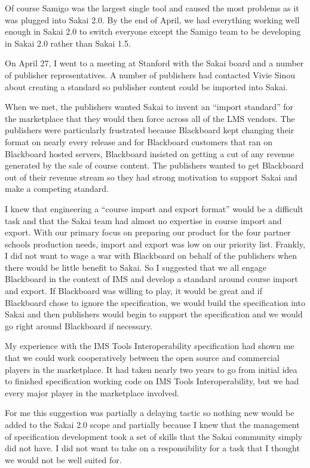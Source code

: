 \documentclass[12pt]{book}
\begin{document}
Of course Samigo was the largest single tool and
caused the most problems as it was plugged into
Sakai 2.0.  By the end of April, we had everything working
well enough in Sakai 2.0 to switch everyone
except the Samigo team to be developing in
Sakai 2.0 rather than Sakai 1.5.

On April 27, I went to a meeting at Stanford with the
Sakai board and a number of publisher representatives.
A number of publishers had contacted Vivie Sinou
about creating a standard so publisher content
could be imported into Sakai.

When we met, the
publishers wanted Sakai to invent an ``import standard''
for the marketplace that they would then force
across all of the LMS vendors.
The publishers were particularly frustrated because
Blackboard kept changing their format on nearly
every release and for Blackboard customers that
ran on Blackboard hosted servers, Blackboard insisted
on getting a cut of any revenue generated by the sale
of course content.  The publishers wanted to get Blackboard
out of their revenue stream so they had strong motivation
to support Sakai and make a competing standard.

I knew that engineering a ``course import and export
format'' would be a difficult task and that the Sakai
team had almost no expertise in course import
and export.  With our primary focus on preparing
our product for the four partner schools production
needs, import and export was low on our priority
list.
Frankly, I did not want to wage a war with
Blackboard on behalf of the publishers when there
would be little benefit to Sakai.  So I
suggested that we all engage Blackboard in the
context of IMS and develop a standard around
course import and export.  If Blackboard was
willing to play, it would be great and if Blackboard
chose to ignore the specification, we would build the
specification into Sakai and then publishers would
begin to support the specification and we would
go right around Blackboard if necessary.

My experience with the IMS Tools Interoperability
specification had shown me that we could work
cooperatively between the open source and commercial
players in the marketplace. It had taken nearly
two years to go from initial idea to finished
specification working code on IMS Tools Interoperability,
but we had every major player in the marketplace involved.

For me this suggestion was partially a delaying tactic
so nothing new would be added to the Sakai 2.0 scope
and partially because I knew that the management
of specification development took a set of skills
that the Sakai community simply did not have.   I did not
want to take on a responsibility for a task that I thought
we would not be well suited for.
\end{document}
